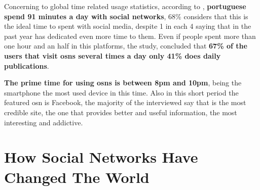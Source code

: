 \indent Concerning to global time related usage statistics, according to \cite{marktest2016}, \textbf{portuguese spend 91 minutes a day with social networks},
68\% considers that this is the ideal time to spent with social media, despite 1 in each 4 saying that in the past year has dedicated even more time to them.
Even if people spent more than one hour and an half in this platforms, the study,
 concluded that \textbf{67\% of the users that visit \glspl{osn} several times a day only 41\% does daily publications}.

\indent \textbf{The prime time for using \glspl{osn} is between 8pm and 10pm}, being the smartphone the most used device in this time. Also in this short period the
featured \gls{osn} is Facebook, the majority of the interviewed say that is the most credible site, the one that provides better and useful information,
the most interesting and addictive.


\section{How Social Networks Have Changed The World}
